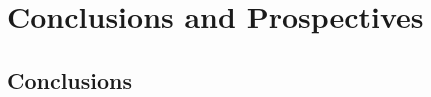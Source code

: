 \documentclass[./dissertation.tex]{subfiles}
\begin{document}
\part{Conclusions and Prospectives}

    \chapter{Conclusions}
\end{document}
